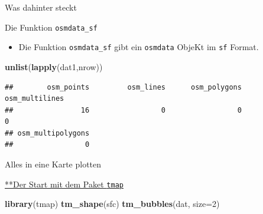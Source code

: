 \documentclass[ignorenonframetext,]{beamer}
\newenvironment{Shaded}{\begin{snugshade}}{\end{snugshade}}
\newcommand{\DataTypeTok}[1]{\textcolor[rgb]{0.13,0.29,0.53}{#1}}
\newcommand{\DecValTok}[1]{\textcolor[rgb]{0.00,0.00,0.81}{#1}}
\newcommand{\KeywordTok}[1]{\textcolor[rgb]{0.13,0.29,0.53}{\textbf{#1}}}
\newcommand{\NormalTok}[1]{#1}
\newcommand{\OperatorTok}[1]{\textcolor[rgb]{0.81,0.36,0.00}{\textbf{#1}}}
\newcommand{\StringTok}[1]{\textcolor[rgb]{0.31,0.60,0.02}{#1}}
\providecommand{\tightlist}{%
  \setlength{\itemsep}{0pt}\setlength{\parskip}{0pt}}
\begin{document}
\begin{frame}{Was dahinter steckt}
\protect\hypertarget{was-dahinter-steckt}{}

\end{frame}

\begin{frame}[fragile]{Die Funktion \texttt{osmdata\_sf}}
\protect\hypertarget{die-funktion-osmdata_sf}{}

\begin{itemize}
\tightlist
\item
  Die Funktion \texttt{osmdata\_sf} gibt ein \texttt{osmdata} ObjeKt im
  \texttt{sf} Format.
\end{itemize}

\begin{Shaded}
\end{Shaded}

\begin{Shaded}
\begin{Highlighting}[]
\KeywordTok{unlist}\NormalTok{(}\KeywordTok{lapply}\NormalTok{(dat1,nrow))}
\end{Highlighting}
\end{Shaded}

\begin{verbatim}
##        osm_points         osm_lines      osm_polygons    osm_multilines 
##                16                 0                 0                 0 
## osm_multipolygons 
##                 0
\end{verbatim}

\end{frame}

\begin{frame}[fragile]{Alles in eine Karte plotten}
\protect\hypertarget{alles-in-eine-karte-plotten}{}

\begin{block}{\href{https://cran.r-project.org/web/packages/tmap/vignettes/tmap-getstarted.html}{**Der
Start mit dem Paket \texttt{tmap}}}

\begin{Shaded}
\begin{Highlighting}[]
\KeywordTok{library}\NormalTok{(tmap)}
\KeywordTok{tm_shape}\NormalTok{(sfc) }
\KeywordTok{tm_bubbles}\NormalTok{(dat, }\DataTypeTok{size=}\DecValTok{2}\NormalTok{)}
\end{Highlighting}
\end{Shaded}

\end{block}

\end{frame}
\end{document}
